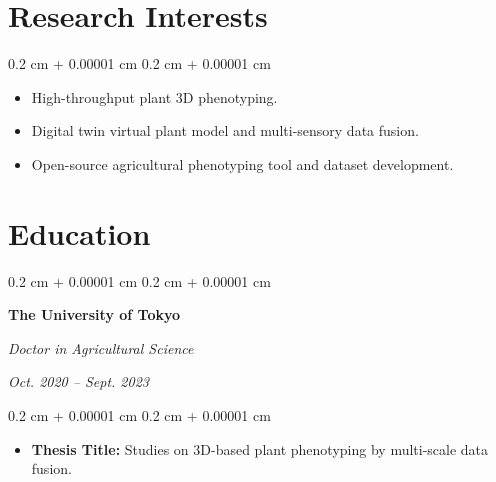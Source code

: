 \documentclass[10pt, letterpaper]{article}
\newenvironment{highlights}{
    \begin{itemize}[
        topsep=0.10 cm,
        parsep=0.10 cm,
        partopsep=0pt,
        itemsep=0pt,
        leftmargin=0.4 cm + 10pt
    ]
}{
    \end{itemize}
} %
\newenvironment{highlightsforbulletentries}{
    \begin{itemize}[
        topsep=0.10 cm,
        parsep=0.10 cm,
        partopsep=0pt,
        itemsep=0pt,
        leftmargin=10pt
    ]
}{
    \end{itemize}
} %
\newenvironment{onecolentry}{
    \begin{adjustwidth}{
        0.2 cm + 0.00001 cm
    }{
        0.2 cm + 0.00001 cm
    }
}{
    \end{adjustwidth}
} %
\newenvironment{twocolentry}[2][]{
    \onecolentry
    \def\secondColumn{#2}
    \setcolumnwidth{\fill, 10.5 cm}
    \begin{paracol}{2}
}{
    \switchcolumn \raggedleft \secondColumn
    \end{paracol}
    \endonecolentry
} %
\let\hrefWithoutArrow\href
\renewcommand{\href}[2]{\hrefWithoutArrow{#1}{\ifthenelse{\equal{#2}{}}{ }{#2 }\raisebox{.15ex}{\footnotesize \faExternalLink*}}}
\begin{document}


    \section{Research Interests}

    \begin{onecolentry}
        \begin{highlightsforbulletentries}

        \item High-throughput plant 3D phenotyping.

        \item Digital twin virtual plant model and multi-sensory data fusion.

        \item Open-source agricultural phenotyping tool and dataset development.

        \end{highlightsforbulletentries}
    \end{onecolentry}


    \section{Education}
        
        \begin{twocolentry}{
            \textit{Oct. 2020 – Sept. 2023}}
            \textbf{The University of Tokyo}

            \textit{Doctor in Agricultural Science}
        \end{twocolentry}

        \vspace{0.10 cm}
        \begin{onecolentry}
            \begin{highlights}
                \item \textbf{Thesis Title:} Studies on 3D-based plant phenotyping by multi-scale data fusion.
            \end{highlights}
        \end{onecolentry}
\end{document}
